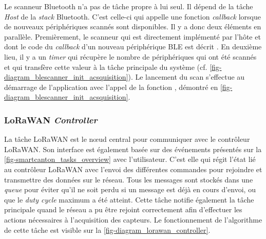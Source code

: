 Le scanneur Bluetooth n'a pas de tâche propre à lui seul. Il dépend de la tâche \textit{Host} de la \textit{stack} Bluetooth. C'est celle-ci qui appelle une fonction \textit{callback} lorsque de nouveaux périphériques scannés sont disponibles. Il y a donc deux éléments en parallèle. Premièrement, le scanneur qui est directement implémenté par l'hôte et dont le code du \textit{callback} d'un nouveau périphérique BLE est décrit . En deuxième lieu, il y a un \textit{timer} qui récupère le nombre de périphériques qui ont été scannés et qui transfère cette valeur à la tâche principale du système (cf. \cref{fig-diagram_blescanner_init_acsquisition}). Le lancement du scan s'effectue au démarrage de l'application avec l'appel de la fonction , démontré en \cref{fig-diagram_blescanner_init_acsquisition}. 






\FloatBarrier
\subsubsection{LoRaWAN \textit{Controller}}


La tâche LoRaWAN est le n\oe ud central pour communiquer avec le contrôleur LoRaWAN. Son interface est également basée sur des événements présentés sur la \cref{fig-smartcanton_tasks_overview} avec l'utilisateur. C'est elle qui régit l'état lié au contrôleur LoRaWAN avec l'envoi des différentes commandes pour rejoindre et transmettre des données sur le réseau. Tous les messages sont stockés dans une \textit{queue} pour éviter qu'il ne soit perdu si un message est déjà en cours d'envoi, ou que le \textit{duty cycle} maximum a été atteint. Cette tâche notifie également la tâche principale quand le réseau a pu être rejoint correctement afin d'effectuer les actions nécessaires à l'acquisition des capteurs. Le fonctionnement de l'algorithme de cette tâche est visible sur la \cref{fig-diagram_lorawan_controller}.

